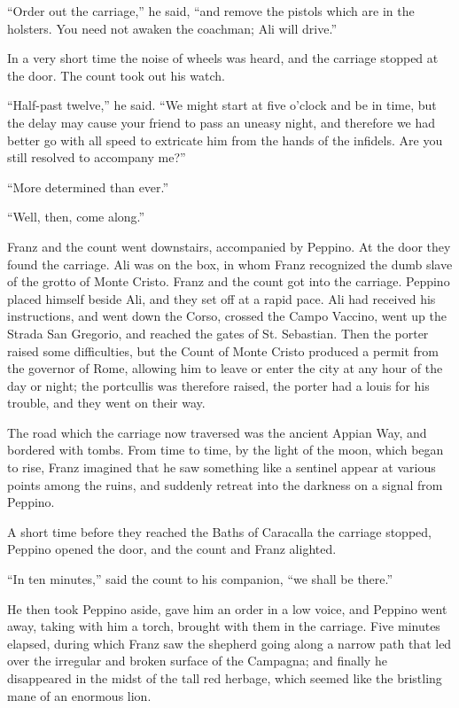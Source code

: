 “Order out the carriage,” he said, “and remove the pistols which are in
the holsters. You need not awaken the coachman; Ali will drive.”

In a very short time the noise of wheels was heard, and the carriage
stopped at the door. The count took out his watch.

“Half-past twelve,” he said. “We might start at five o’clock and be in
time, but the delay may cause your friend to pass an uneasy night, and
therefore we had better go with all speed to extricate him from the
hands of the infidels. Are you still resolved to accompany me?”

“More determined than ever.”

“Well, then, come along.”

Franz and the count went downstairs, accompanied by Peppino. At the
door they found the carriage. Ali was on the box, in whom Franz
recognized the dumb slave of the grotto of Monte Cristo. Franz and the
count got into the carriage. Peppino placed himself beside Ali, and
they set off at a rapid pace. Ali had received his instructions, and
went down the Corso, crossed the Campo Vaccino, went up the Strada San
Gregorio, and reached the gates of St. Sebastian. Then the porter
raised some difficulties, but the Count of Monte Cristo produced a
permit from the governor of Rome, allowing him to leave or enter the
city at any hour of the day or night; the portcullis was therefore
raised, the porter had a louis for his trouble, and they went on their
way.

The road which the carriage now traversed was the ancient Appian Way,
and bordered with tombs. From time to time, by the light of the moon,
which began to rise, Franz imagined that he saw something like a
sentinel appear at various points among the ruins, and suddenly retreat
into the darkness on a signal from Peppino.

A short time before they reached the Baths of Caracalla the carriage
stopped, Peppino opened the door, and the count and Franz alighted.

“In ten minutes,” said the count to his companion, “we shall be there.”

He then took Peppino aside, gave him an order in a low voice, and
Peppino went away, taking with him a torch, brought with them in the
carriage. Five minutes elapsed, during which Franz saw the shepherd
going along a narrow path that led over the irregular and broken
surface of the Campagna; and finally he disappeared in the midst of the
tall red herbage, which seemed like the bristling mane of an enormous
lion.

